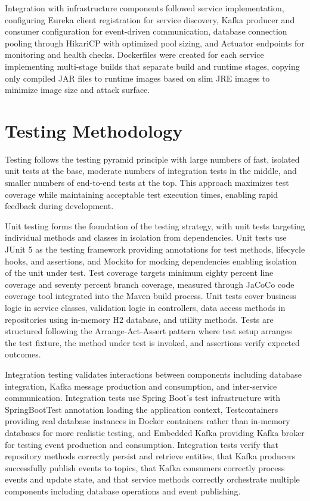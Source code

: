 Integration with infrastructure components followed service implementation, configuring Eureka client registration for service discovery, Kafka producer and consumer configuration for event-driven communication, database connection pooling through HikariCP with optimized pool sizing, and Actuator endpoints for monitoring and health checks. Dockerfiles were created for each service implementing multi-stage builds that separate build and runtime stages, copying only compiled JAR files to runtime images based on slim JRE images to minimize image size and attack surface.

\section{Testing Methodology}

Testing follows the testing pyramid principle with large numbers of fast, isolated unit tests at the base, moderate numbers of integration tests in the middle, and smaller numbers of end-to-end tests at the top. This approach maximizes test coverage while maintaining acceptable test execution times, enabling rapid feedback during development.

Unit testing forms the foundation of the testing strategy, with unit tests targeting individual methods and classes in isolation from dependencies. Unit tests use JUnit 5 as the testing framework providing annotations for test methods, lifecycle hooks, and assertions, and Mockito for mocking dependencies enabling isolation of the unit under test. Test coverage targets minimum eighty percent line coverage and seventy percent branch coverage, measured through JaCoCo code coverage tool integrated into the Maven build process. Unit tests cover business logic in service classes, validation logic in controllers, data access methods in repositories using in-memory H2 database, and utility methods. Tests are structured following the Arrange-Act-Assert pattern where test setup arranges the test fixture, the method under test is invoked, and assertions verify expected outcomes.

Integration testing validates interactions between components including database integration, Kafka message production and consumption, and inter-service communication. Integration tests use Spring Boot's test infrastructure with SpringBootTest annotation loading the application context, Testcontainers providing real database instances in Docker containers rather than in-memory databases for more realistic testing, and Embedded Kafka providing Kafka broker for testing event production and consumption. Integration tests verify that repository methods correctly persist and retrieve entities, that Kafka producers successfully publish events to topics, that Kafka consumers correctly process events and update state, and that service methods correctly orchestrate multiple components including database operations and event publishing.

